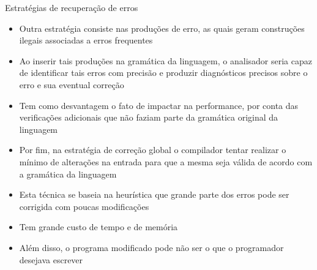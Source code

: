 \begin{frame}[fragile]{Estratégias de recuperação de erros}

    \begin{itemize}
        \item Outra estratégia consiste nas produções de erro, as quais geram construções ilegais associadas a erros frequentes

        \item Ao inserir tais produções na gramática da linguagem, o analisador seria capaz de identificar tais erros com precisão e produzir diagnósticos precisos
            sobre o erro e sua eventual correção

        \item Tem como desvantagem o fato de impactar na performance, por conta das verificações adicionais que não faziam parte da gramática original da linguagem

        \item Por fim, na estratégia de correção global o compilador tentar realizar o mínimo de alterações na entrada para que a mesma seja válida de acordo
            com a gramática da linguagem

        \item Esta técnica se baseia na heurística que grande parte dos erros pode ser corrigida com poucas modificações

        \item Tem grande custo de tempo e de memória

        \item Além disso, o programa modificado pode não ser o que o programador desejava escrever
    \end{itemize}

\end{frame}
